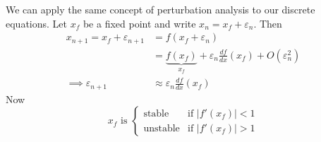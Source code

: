 \documentclass{../template/note}
\begin{document}
    We can apply the same concept of perturbation analysis to our discrete equations. Let \(x_f\) be a fixed point and write \(x_n = x_f + \varepsilon_n\). Then
    \begin{align*}
        x_{n+1} = x_f + \varepsilon_{n+1} &= f(x_f + \varepsilon_n) \\
        &= \underbrace{f(x_f)}_{x_f} + \varepsilon_n \frac{df}{dx}(x_f) + O(\varepsilon_n^2) \\
        \implies \varepsilon_{n+1} &\approx \varepsilon_n \frac{df}{dx}(x_f)
    \end{align*}
    Now
    \[
        x_f \text{ is } \begin{cases}
            \text{stable} & \text{if } |f'(x_f)| < 1 \\
            \text{unstable} & \text{if } |f'(x_f)| > 1
        \end{cases}
    \]
    
\end{document}
